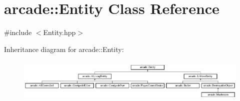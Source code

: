 \hypertarget{classarcade_1_1_entity}{\section{arcade\-:\-:Entity Class Reference}
\label{classarcade_1_1_entity}
}


{\ttfamily \#include $<$Entity.\-hpp$>$}

Inheritance diagram for arcade\-:\-:Entity\-:\begin{figure}[H]
\begin{center}
\leavevmode
\includegraphics[height=2.085661cm]{classarcade_1_1_entity}
\end{center}
\end{figure}
